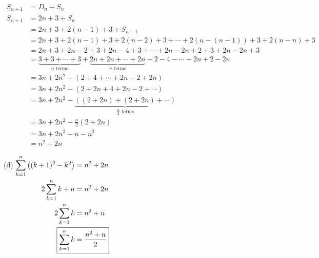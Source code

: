 \documentclass{article}
\begin{document}
\begin{itemize}
\begin{minipage}[t]{0.6\linewidth}
$\begin{aligned}
	S_{n+1}&=D_n+S_n \\
	S_{n+1}&=2n+3+S_n \\
	&=2n+3+2(n-1)+3+S_{n-1} \\
	&=2n+3+2(n-1)+3+2(n-2)+3+\cdots+2(n-(n-1))+3+2(n-n)+3 \\
	&=2n+3+2n-2+3+2n-4+3+\cdots+2n-2n+2+3+2n-2n+3 \\
	&=\underbrace{3+3+\cdots+3}_{n\text{ terms}}+
		\underbrace{2n+2n+\cdots+2n}_{n\text{ terms}}
		-2-4-\cdots-2n+2-2n \\
	&=3n+2n^2-(2+4+\cdots+2n-2+2n) \\
	&=3n+2n^2-(2+2n+4+2n-2+\cdots) \\
	&=3n+2n^2-\underbrace{((2+2n)+(2+2n)+\cdots)}_{\frac{n}{2}
		\text{ terms}} \\
	&=3n+2n^2-\frac{n}{2}(2+2n) \\
	&=3n+2n^2-n-n^2 \\
	&=\boxed{n^2+2n}
\end{aligned}$
\end{minipage}
\begin{minipage}[t]{0.3\linewidth}
\item[(d)]
$\begin{aligned}[t]
	\sum_{k=1}^{n}\left((k+1)^2-k^2\right)&=n^2+2n \\
	2\sum_{k=1}^{n}k+n&=n^2+2n \\
	2\sum_{k=1}^{n}k&=n^2+n \\
	\Aboxed{\sum_{k=1}^{n}k&=\frac{n^2+n}{2}} \\
\end{aligned}$
\end{minipage}
\end{itemize}

\pagebreak
\end{document}
